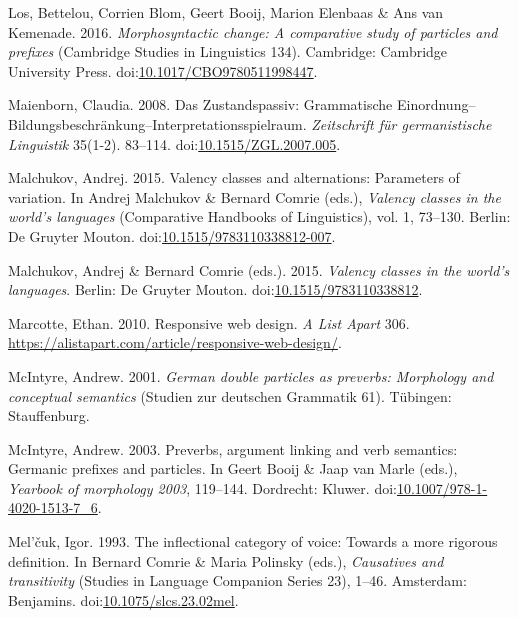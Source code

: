\leavevmode{}%
Los, Bettelou, Corrien Blom, Geert Booij, Marion Elenbaas \& Ans van
Kemenade. 2016. \emph{Morphosyntactic change: A comparative study of
particles and prefixes} (Cambridge Studies in Linguistics 134).
Cambridge: Cambridge University Press.
doi:\href{https://doi.org/10.1017/CBO9780511998447}{10.1017/CBO9780511998447}.

\leavevmode{}%
Maienborn, Claudia. 2008. Das {Zustandspassiv}: Grammatische
{Einordnung}--{Bildungsbeschränkung}--{Interpretationsspielraum}.
\emph{Zeitschrift für germanistische Linguistik} 35(1-2). 83--114.
doi:\href{https://doi.org/10.1515/ZGL.2007.005}{10.1515/ZGL.2007.005}.

\leavevmode{}%
Malchukov, Andrej. 2015. Valency classes and alternations: Parameters of
variation. In Andrej Malchukov \& Bernard Comrie (eds.), \emph{Valency
classes in the world's languages} (Comparative Handbooks of
Linguistics), vol. 1, 73--130. Berlin: De Gruyter Mouton.
doi:\href{https://doi.org/10.1515/9783110338812-007}{10.1515/9783110338812-007}.

\leavevmode{}%
Malchukov, Andrej \& Bernard Comrie (eds.). 2015. \emph{Valency classes
in the world's languages}. Berlin: De Gruyter Mouton.
doi:\href{https://doi.org/10.1515/9783110338812}{10.1515/9783110338812}.

\leavevmode{}%
Marcotte, Ethan. 2010. Responsive web design. \emph{A List Apart} 306.
\url{https://alistapart.com/article/responsive-web-design/}.

\leavevmode{}%
McIntyre, Andrew. 2001. \emph{German double particles as preverbs:
Morphology and conceptual semantics} (Studien {zur} {deutschen}
Grammatik 61). Tübingen: Stauffenburg.

\leavevmode{}%
McIntyre, Andrew. 2003. Preverbs, argument linking and verb semantics:
{Germanic} prefixes and particles. In Geert Booij \& Jaap van Marle
(eds.), \emph{Yearbook of morphology 2003}, 119--144. Dordrecht: Kluwer.
doi:\href{https://doi.org/10.1007/978-1-4020-1513-7_6}{10.1007/978-1-4020-1513-7\_6}.

\leavevmode{}%
Mel'čuk, Igor. 1993. The inflectional category of voice: Towards a more
rigorous definition. In Bernard Comrie \& Maria Polinsky (eds.),
\emph{Causatives and transitivity} (Studies in Language Companion Series
23), 1--46. Amsterdam: Benjamins.
doi:\href{https://doi.org/10.1075/slcs.23.02mel}{10.1075/slcs.23.02mel}.

